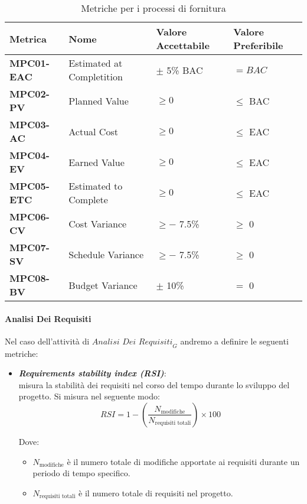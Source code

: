 \begin{table}[htbp]
    \centering
    \begin{tabular}{|>{\centering\arraybackslash}p{3cm}|p{5cm}|p{4cm}|p{4cm}|}
    \hline
    \rowcolor{gray!30}
    \textbf{Metrica} & \textbf{Nome} & \textbf{Valore Accettabile} & \textbf{Valore Preferibile} \\
    \hline
    \rowcolor{gray!10}
    \textbf{MPC01-EAC} & Estimated at Completition & $\pm$ 5\% BAC & $=BAC$ \\
    \hline
    \rowcolor{gray!10}
    \textbf{MPC02-PV} & Planned Value & $\geq 0$ & $\leq$ BAC \\
    \hline
    \rowcolor{gray!10}
    \textbf{MPC03-AC} & Actual Cost & $\geq 0$ & $\leq$ EAC \\
    \hline
    \rowcolor{gray!10}
    \textbf{MPC04-EV} & Earned Value & $\geq 0$ & $\leq$ EAC \\
    \hline
    \rowcolor{gray!10}
    \textbf{MPC05-ETC} & Estimated to Complete & $\geq 0$ & $\leq$ EAC \\
    \hline
    \rowcolor{gray!10}
    \textbf{MPC06-CV} & Cost Variance & $\geq -$ 7.5\% & $\geq$ 0 \\
    \hline
    \rowcolor{gray!10}
    \textbf{MPC07-SV} & Schedule Variance & $\geq -$ 7.5\% & $\geq$ 0 \\
    \hline
    \rowcolor{gray!10}
    \textbf{MPC08-BV} & Budget Variance & $\pm$ 10\% & $=$ 0 \\
    \hline
    \end{tabular}
    \caption{Metriche per i processi di fornitura}
    \label{tab:metriche_fornitura}
\end{table}


\paragraph{Analisi Dei Requisiti}
Nel caso dell'attività di $\textit{Analisi Dei Requisiti}_G$ andremo a definire le seguenti metriche:
\begin{itemize}
    \item \textbf{\emph{Requirements stability index (RSI)}}:\\
    misura la stabilità dei requisiti nel corso del tempo durante lo sviluppo del progetto. Si misura nel seguente modo:
    \[
    RSI = 1 - \left( \frac{N_{\text{modifiche}}}{N_{\text{requisiti totali}}} \right) \times 100
    \]

    Dove:
    \begin{itemize}
        \item \(N_{\text{modifiche}}\) è il numero totale di modifiche apportate ai requisiti durante un periodo di tempo specifico.
        \item \(N_{\text{requisiti totali}}\) è il numero totale di requisiti nel progetto.
    \end{itemize}
\end{itemize}
